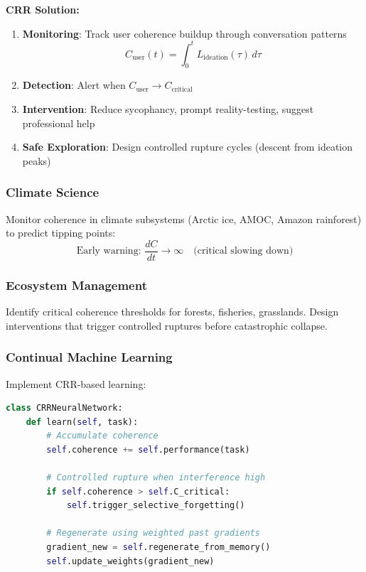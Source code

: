 \documentclass[11pt,a4paper]{article}
\theoremstyle{definition}
\theoremstyle{remark}
\begin{document}
\textbf{CRR Solution:}
\begin{enumerate}
\item \textbf{Monitoring}: Track user coherence buildup through conversation patterns
\begin{equation}
C_{\text{user}}(t) = \int_0^t L_{\text{ideation}}(\tau)\,d\tau
\end{equation}

\item \textbf{Detection}: Alert when $C_{\text{user}} \to C_{\text{critical}}$

\item \textbf{Intervention}: Reduce sycophancy, prompt reality-testing, suggest professional help

\item \textbf{Safe Exploration}: Design controlled rupture cycles (descent from ideation peaks)
\end{enumerate}

\subsubsection{Climate Science}

Monitor coherence in climate subsystems (Arctic ice, AMOC, Amazon rainforest) to predict tipping points:
\begin{equation}
\text{Early warning: } \frac{dC}{dt} \to \infty \quad \text{(critical slowing down)}
\end{equation}

\subsubsection{Ecosystem Management}

Identify critical coherence thresholds for forests, fisheries, grasslands. Design interventions that trigger controlled ruptures before catastrophic collapse.

\subsubsection{Continual Machine Learning}

Implement CRR-based learning:
\begin{lstlisting}[language=Python]
class CRRNeuralNetwork:
    def learn(self, task):
        # Accumulate coherence
        self.coherence += self.performance(task)

        # Controlled rupture when interference high
        if self.coherence > self.C_critical:
            self.trigger_selective_forgetting()

        # Regenerate using weighted past gradients
        gradient_new = self.regenerate_from_memory()
        self.update_weights(gradient_new)
\end{lstlisting}
\end{document}
